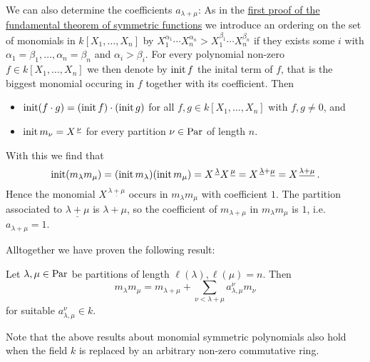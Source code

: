 \begin{fluff}
  We can also determine the coefficients $a_{\lambda + \mu}$:
  As in the \hyperref[label: first proof of fundamental theorem]{first proof of the fundamental theorem of symmetric functions} we introduce an ordering on the set of monomials in $k[X_1, \dotsc, X_n]$ by $X_1^{\alpha_1} \dotsm X_n^{\alpha_n} > X_1^{\beta_1} \dotsm X_n^{\beta_n}$ if they exists some $i$ with $\alpha_1 = \beta_1, \dotsc, \alpha_n = \beta_n$ and $\alpha_i > \beta_i$.
  For every polynomial non-zero $f \in k[X_1, \dotsc, X_n]$ we then denote by $\operatorname{init} f$ the inital term of $f$, that is the biggest monomial occuring in $f$ together with its coefficient.
  Then
  \begin{itemize}
    \item
      $\operatorname{init}(f \cdot g) = (\operatorname{init} f) \cdot (\operatorname{init} g)$ for all $f, g \in k[X_1, \dotsc, X_n]$ with $f, g \neq 0$, and
    \item
      $\operatorname{init} m_\nu = X^{\,\underline{\nu}}$ for every partition $\nu \in \operatorname{Par}$ of length $n$.
  \end{itemize}
  With this we find that
  \[
      \operatorname{init}(m_\lambda m_\mu)
    = (\operatorname{init} m_\lambda) (\operatorname{init} m_\mu)
    = X^{\,\underline{\lambda}} X^{\,\underline{\mu}}
    = X^{\,\underline{\lambda} + \underline{\mu}}
    = X^{\,\underline{\lambda + \mu}} \,.
  \]
  Hence the monomial $X^{\,\underline{\lambda + \mu}}$ occurs in $m_\lambda m_\mu$ with coefficient $1$.
  The partition associated to $\underline{\lambda + \mu}$ is $\lambda + \mu$, so the coefficient of $m_{\lambda + \mu}$ in $m_\lambda m_\mu$ is $1$, i.e.\ $a_{\lambda + \mu} = 1$.
  
  Alltogether we have proven the following result:
\end{fluff}


\begin{lemma}
  Let $\lambda, \mu \in \operatorname{Par}$ be partitions of length $\ell(\lambda), \ell(\mu) = n$.
  Then
  \[
        m_{\lambda} m_{\mu}
    =   m_{\lambda + \mu}
      + \sum_{\nu < \lambda + \mu} a^\nu_{\lambda,\mu} m_\nu
  \]
  for suitable $a^\nu_{\lambda,\mu} \in k$.
\end{lemma}


\begin{remark}
  Note that the above results about monomial symmetric polynomials also hold when the field $k$ is replaced by an arbitrary non-zero commutative ring.
\end{remark}






